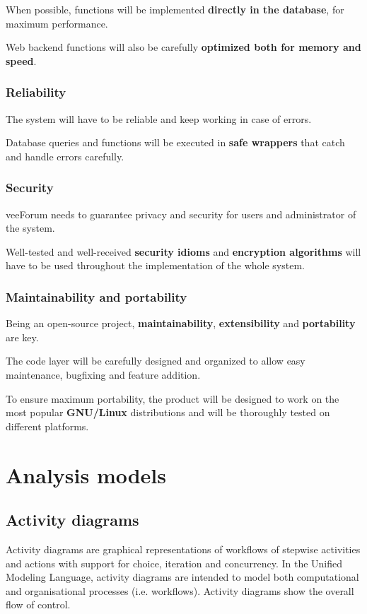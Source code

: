 \documentclass[12pt]{report}
\renewcommand\emph{\textbf}
\begin{document}
                        When possible, functions will be implemented \emph{directly in the database}, for maximum performance.

                        Web backend functions will also be carefully \emph{optimized both for memory and speed}.

                    \subsubsection{Reliability}
                        The system will have to be reliable and keep working in case of errors.

                        Database queries and functions will be executed in \emph{safe wrappers} that catch and handle errors carefully.

                    \subsubsection{Security}
                        veeForum needs to guarantee privacy and security for users and administrator of the system.

                        Well-tested and well-received \emph{security idioms} and \emph{encryption algorithms} will have to be used throughout the implementation of the whole system.

                    \subsubsection{Maintainability and portability}
                        Being an open-source project, \emph{maintainability}, \emph{extensibility} and \emph{portability} are key.

                        The code layer will be carefully designed and organized to allow easy maintenance, bugfixing and feature addition.

                        To ensure maximum portability, the product will be designed to work on the most popular \emph{GNU/Linux} distributions and will be thoroughly tested on different platforms.
            
            \section{Analysis models}
                \subsection{Activity diagrams}
                    Activity diagrams are graphical representations of workflows of stepwise activities and actions with support for choice, iteration and concurrency. 
                    In the Unified Modeling Language, activity diagrams are intended to model both computational and organisational processes (i.e. workflows). 
                    Activity diagrams show the overall flow of control.
\end{document}
